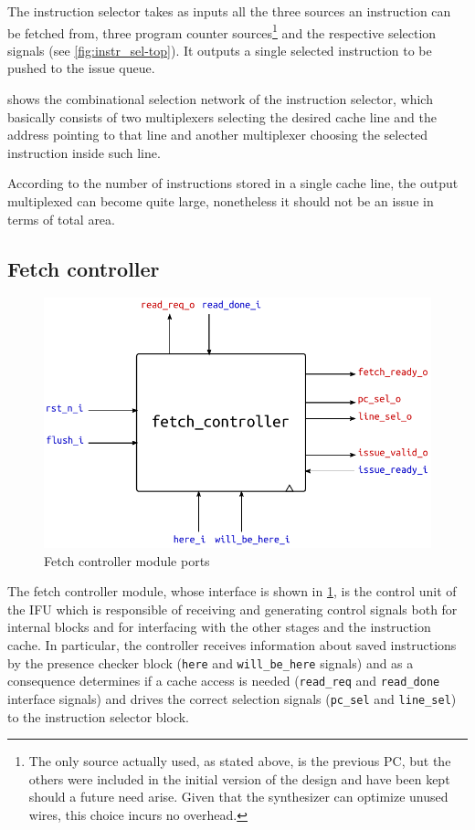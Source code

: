 The instruction selector takes as inputs all the three sources an instruction can be fetched from, three program counter sources\footnote{The only source actually used, as stated above, is the previous \ac{PC}, but the others were included in the initial version of the design and have been kept should a future need arise. Given that the synthesizer can optimize unused wires, this choice incurs no overhead.} and the respective selection signals (see \cref{fig:instr_sel-top}). It outputs a single selected instruction to be pushed to the issue queue.

 shows the combinational selection network of the instruction selector, which basically consists of two multiplexers selecting the desired cache line and the address pointing to that line and another multiplexer choosing the selected instruction inside such line.

According to the number of instructions stored in a single cache line, the output multiplexed can become quite large, nonetheless it should not be an issue in terms of total area.

\subsection{Fetch controller}
\begin{figure}[hbt]
  \centering
  \includegraphics{img/fetch_controller-top.pdf}
  \caption{Fetch controller module ports}
  \label{fig:fetch_controller-top}
\end{figure}
The fetch controller module, whose interface is shown in \cref{fig:fetch_controller-top}, is the control unit of the \ac{IFU} which is responsible of receiving and generating control signals both for internal blocks and for interfacing with the other stages and the instruction cache. In particular, the controller receives information about saved instructions by the presence checker block (\texttt{here} and \texttt{will\_be\_here} signals) and as a consequence determines if a cache access is needed (\texttt{read\_req} and \texttt{read\_done} interface signals) and drives the correct selection signals (\texttt{pc\_sel} and \texttt{line\_sel}) to the instruction selector block.

